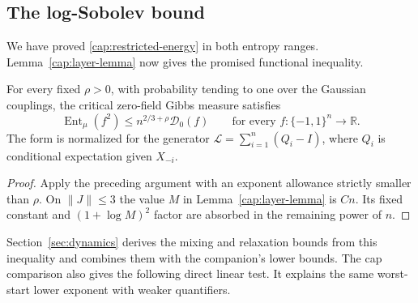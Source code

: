 \subsection{The log-Sobolev bound}\label{cap:dynamics}

We have proved \eqref{cap:restricted-energy} in both entropy ranges.
Lemma~\ref{cap:layer-lemma} now gives the promised functional inequality.

\begin{theorem}\label{cap:thm-lsi}
For every fixed $\rho>0$, with probability tending to one over the
Gaussian couplings, the critical zero-field Gibbs measure satisfies
\begin{equation}\label{cap:final-lsi}
 \operatorname{Ent}_\mu(f^2)
 \le n^{2/3+\rho}\mathcal D_0(f)
 \qquad\text{for every }f:\{-1,1\}^n\longrightarrow\mathbb R.
\end{equation}
The form is normalized for the generator
$\mathcal L=\sum_{i=1}^n(Q_i-I)$, where $Q_i$ is conditional expectation
given $X_{-i}$.
\end{theorem}

\begin{proof}
Apply the preceding argument with an exponent allowance strictly
smaller than $\rho$.  On $\|J\|\le3$ the value $M$ in
Lemma~\ref{cap:layer-lemma} is $Cn$.  Its fixed constant and
$(1+\log M)^2$ factor are absorbed in the remaining power of $n$.
\end{proof}

Section~\ref{sec:dynamics} derives the mixing and relaxation bounds from
this inequality and combines them with the companion's lower bounds.
The cap comparison also gives the following direct linear test. It explains
the same worst-start lower exponent with weaker quantifiers.

